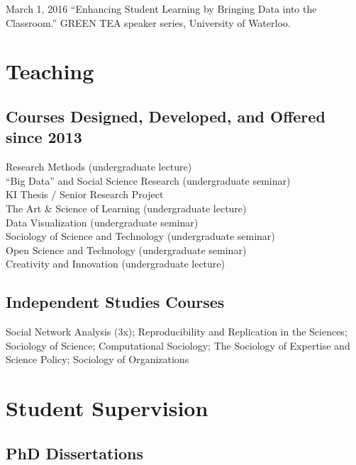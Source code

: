 \ind March 1, 2016 ``Enhancing Student Learning by Bringing Data into
the Classroom.'' GREEN TEA speaker series, University of Waterloo.

\section{Teaching}\label{teaching}

\subsection{Courses Designed, Developed, and Offered since
2013}\label{courses-designed-developed-and-offered-since-2013}

\noindent Research Methods (undergraduate lecture)\\
\noindent ``Big Data'' and Social Science Research (undergraduate
seminar)\\
\noindent KI Thesis / Senior Research Project\\
\noindent The Art \& Science of Learning (undergraduate lecture)\\
\noindent Data Visualization (undergraduate seminar)\\
\noindent Sociology of Science and Technology (undergraduate seminar)\\
\noindent Open Science and Technology (undergraduate seminar)\\
\noindent Creativity and Innovation (undergraduate lecture)

\subsection{Independent Studies
Courses}\label{independent-studies-courses}

\noindent Social Network Analysis (3x); Reproducibility and Replication
in the Sciences; Sociology of Science; Computational Sociology; The
Sociology of Expertise and Science Policy; Sociology of Organizations

\section{Student Supervision}\label{student-supervision}

\subsection{PhD Dissertations}\label{phd-dissertations}

